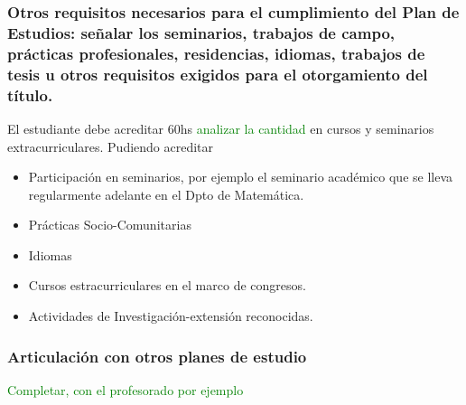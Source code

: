 \documentclass[a4paper, 12pt]{article}
\begin{document}
\subsubsection{Otros requisitos necesarios para el cumplimiento del Plan de Estudios: señalar los seminarios, trabajos de campo, prácticas profesionales, residencias, idiomas, trabajos de tesis u otros requisitos exigidos para el otorgamiento del título.} 

El estudiante debe acreditar 60hs \textcolor{green}{analizar la cantidad} en cursos y seminarios extracurriculares. Pudiendo acreditar
\begin{itemize}
 \item Participación en seminarios, por ejemplo el seminario académico que se lleva regularmente adelante en el Dpto de Matemática.
 \item Prácticas Socio-Comunitarias 
 \item Idiomas
 \item Cursos estracurriculares en el marco de congresos.
 \item Actividades de Investigación-extensión reconocidas.
 \end{itemize}


\subsubsection{Articulación con otros planes de estudio}

\textcolor{green}{Completar, con el profesorado por ejemplo}
\end{document}
